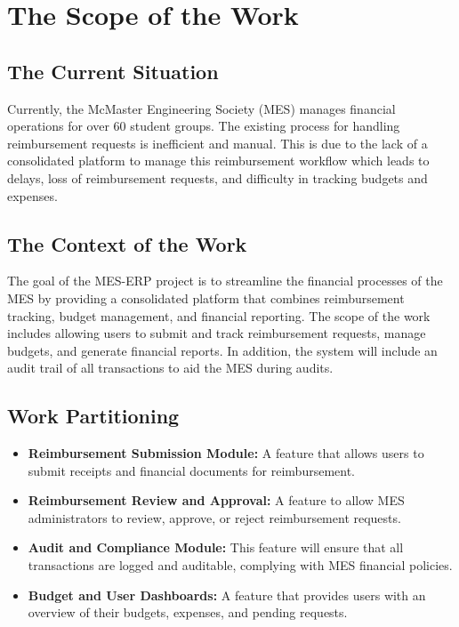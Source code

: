 \documentclass[12pt]{article}
\begin{document}
\section{The Scope of the Work}
\subsection{The Current Situation}
Currently, the McMaster Engineering Society (MES) manages financial operations for over 60 student groups. The existing process for handling reimbursement requests is inefficient and manual. This is due to the lack of a consolidated platform to manage this reimbursement workflow which leads to delays, loss of reimbursement requests, and difficulty in tracking budgets and expenses.

\subsection{The Context of the Work}
The goal of the MES-ERP project is to streamline the financial processes of the MES by providing a consolidated platform that combines reimbursement tracking, budget management, and financial reporting. The scope of the work includes allowing users to submit and track reimbursement requests, manage budgets, and generate financial reports. In addition, the system will include an audit trail of all transactions to aid the MES during audits.

\subsection{Work Partitioning}
\begin{itemize}
  \item \textbf{Reimbursement Submission Module:} A feature that allows users to submit receipts and financial documents for reimbursement.
  \item \textbf{Reimbursement Review and Approval:} A feature to allow MES administrators to review, approve, or reject reimbursement requests.
  \item \textbf{Audit and Compliance Module:} This feature will ensure that all transactions are logged and auditable, complying with MES financial policies.
  \item \textbf{Budget and User Dashboards:} A feature that provides users with an overview of their budgets, expenses, and pending requests.
\end{itemize}
\end{document}
